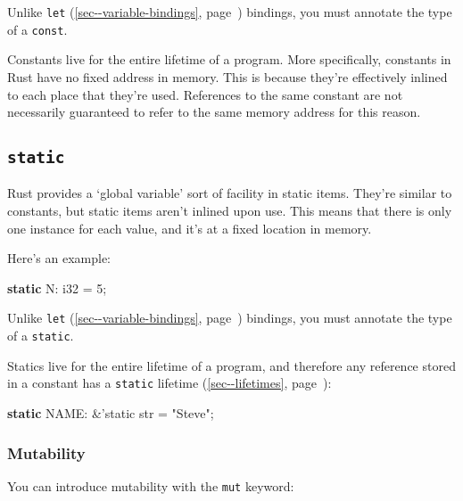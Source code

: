 \documentclass[a4paper,]{book}
\renewcommand*{\hyperref}[2][\ar]{%
  \def\ar{#2}%
  #2 (\autoref{#1}, page~\pageref{#1})}
\newenvironment{Shaded}{\begin{snugshade}}{\end{snugshade}}
\newcommand{\KeywordTok}[1]{\textcolor[rgb]{0.13,0.29,0.53}{\textbf{{#1}}}}
\newcommand{\DataTypeTok}[1]{\textcolor[rgb]{0.13,0.29,0.53}{{#1}}}
\newcommand{\DecValTok}[1]{\textcolor[rgb]{0.00,0.00,0.81}{{#1}}}
\newcommand{\StringTok}[1]{\textcolor[rgb]{0.31,0.60,0.02}{{#1}}}
\newcommand{\OtherTok}[1]{\textcolor[rgb]{0.56,0.35,0.01}{{#1}}}
\newcommand{\NormalTok}[1]{{#1}}
\begin{document}
Unlike \hyperref[sec--variable-bindings]{\texttt{let}} bindings, you
must annotate the type of a \texttt{const}.

Constants live for the entire lifetime of a program. More specifically,
constants in Rust have no fixed address in memory. This is because
they're effectively inlined to each place that they're used. References
to the same constant are not necessarily guaranteed to refer to the same
memory address for this reason.

\subsection{\texorpdfstring{\texttt{static}}{static}}\label{static-1}

Rust provides a `global variable' sort of facility in static items.
They're similar to constants, but static items aren't inlined upon use.
This means that there is only one instance for each value, and it's at a
fixed location in memory.

Here's an example:

\begin{Shaded}
\begin{Highlighting}[]
\KeywordTok{static} \NormalTok{N: }\DataTypeTok{i32} \NormalTok{= }\DecValTok{5}\NormalTok{;}
\end{Highlighting}
\end{Shaded}

Unlike \hyperref[sec--variable-bindings]{\texttt{let}} bindings, you
must annotate the type of a \texttt{static}.

Statics live for the entire lifetime of a program, and therefore any
reference stored in a constant has a
\hyperref[sec--lifetimes]{\texttt{\textquotesingle{}static} lifetime}:

\begin{Shaded}
\begin{Highlighting}[]
\KeywordTok{static} \NormalTok{NAME: &}\OtherTok{'static} \DataTypeTok{str} \NormalTok{= }\StringTok{"Steve"}\NormalTok{;}
\end{Highlighting}
\end{Shaded}

\subsubsection{Mutability}\label{mutability}

You can introduce mutability with the \texttt{mut} keyword:
\end{document}
